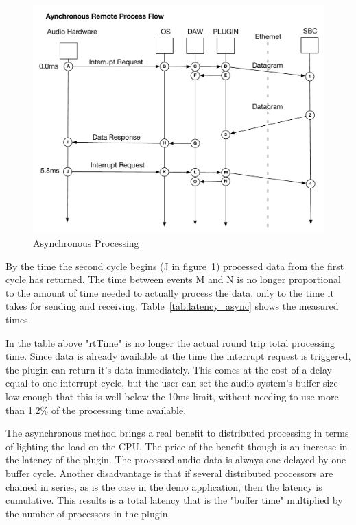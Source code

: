 \begin{figure}[H]
    \centering
    \includegraphics[width=\textwidth]{assets/conclusion/async_flow.pdf}
    \caption{Asynchronous Processing}
    \label{fig:async_remote}
\end{figure}

By the time the second cycle begins (J in figure~\ref{fig:async_remote}) processed data from the first cycle has returned. The time between events M and N is no longer proportional to the amount of time needed to actually process the data, only to the time it takes for sending and receiving. Table~\ref{tab:latency_async} shows the measured times.



In the table above "rtTime" is no longer the actual round trip total processing time. Since data is already available at the time the interrupt request is triggered, the plugin can return it's data immediately. This comes at the cost of a delay equal to one interrupt cycle, but the user can set the audio system's buffer size low enough that this is well below the 10ms limit, without needing to use more than 1.2\% of the processing time available.

The asynchronous method brings a real benefit to distributed processing in terms of lighting the load on the CPU. The price of the benefit though is an increase in the latency of the plugin. The processed audio data is always one delayed by one buffer cycle. Another disadvantage is that if several distributed processors are chained in series, as is the case in the demo application, then the latency is cumulative. This results is a total latency that is the "buffer time" multiplied by the number of processors in the
plugin.

